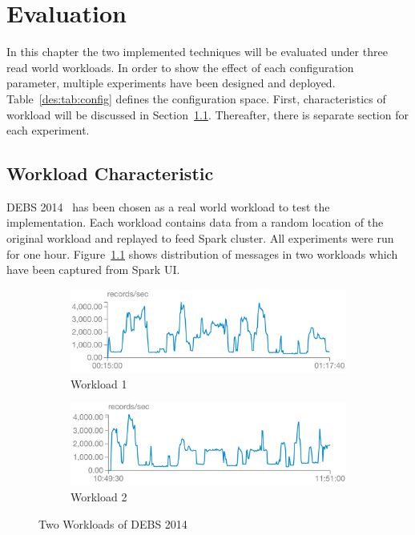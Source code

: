\chapter{Evaluation}
\label{eval}
In this chapter the two implemented techniques will be evaluated under three read world workloads. In order to show the effect of each configuration parameter, multiple experiments have been designed and deployed. Table~\ref{des:tab:config} defines the configuration space. First, characteristics of workload will be discussed in Section~\ref{eval:workload}. Thereafter, there is separate section for each experiment.

\section{Workload Characteristic}
\label{eval:workload}

DEBS 2014~\cite{debs2014} has been chosen as a real world workload to test the implementation. Each workload contains data from a random location of the original workload and replayed to feed Spark cluster. All experiments were run for one hour. Figure~\ref{eval:fig:workload} shows distribution of messages in two workloads which have been captured from Spark UI.
\begin{figure}[!htbp]
    \centering
      \begin{subfigure}[h]{\linewidth}
        \centering\includegraphics[scale=0.6]{workload1.png}
        \caption{Workload 1}
    \end{subfigure}
    \begin{subfigure}[h]{\linewidth}
        \centering\includegraphics[scale=0.6]{workload2.png}
        \caption{Workload 2}
    \end{subfigure}
    \caption{Two Workloads of DEBS 2014}
    \label{eval:fig:workload}
\end{figure}

